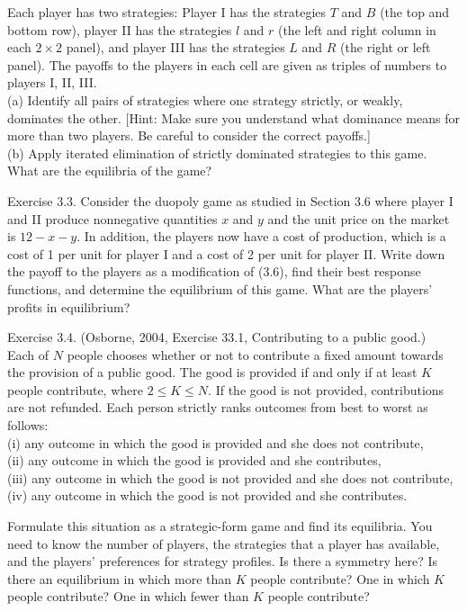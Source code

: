 \documentclass[12pt]{article}
\begin{document}
Each player has two strategies: Player I has the strategies $T$ and $B$ (the top and bottom row), player II has the strategies $l$ and $r$ (the left and right column in each $2 \times 2$ panel), and player III has the strategies $L$ and $R$ (the right or left panel). The payoffs to the players in each cell are given as triples of numbers to players I, II, III.\\[0pt]
(a) Identify all pairs of strategies where one strategy strictly, or weakly, dominates the other. [Hint: Make sure you understand what dominance means for more than two players. Be careful to consider the correct payoffs.]\\
(b) Apply iterated elimination of strictly dominated strategies to this game. What are the equilibria of the game?

Exercise 3.3. Consider the duopoly game as studied in Section 3.6 where player I and II produce nonnegative quantities $x$ and $y$ and the unit price on the market is $12-x-y$. In addition, the players now have a cost of production, which is a cost of 1 per unit for player I and a cost of 2 per unit for player II. Write down the payoff to the players as a modification of (3.6), find their best response functions, and determine the equilibrium of this game. What are the players' profits in equilibrium?

Exercise 3.4. (Osborne, 2004, Exercise 33.1, Contributing to a public good.)\\
Each of $N$ people chooses whether or not to contribute a fixed amount towards the provision of a public good. The good is provided if and only if at least $K$ people contribute, where $2 \leq K \leq N$. If the good is not provided, contributions are not refunded. Each person strictly ranks outcomes from best to worst as follows:\\
(i) any outcome in which the good is provided and she does not contribute,\\
(ii) any outcome in which the good is provided and she contributes,\\
(iii) any outcome in which the good is not provided and she does not contribute,\\
(iv) any outcome in which the good is not provided and she contributes.

Formulate this situation as a strategic-form game and find its equilibria. You need to know the number of players, the strategies that a player has available, and the players' preferences for strategy profiles. Is there a symmetry here? Is there an equilibrium in which more than $K$ people contribute? One in which $K$ people contribute? One in which fewer than $K$ people contribute?
\end{document}

